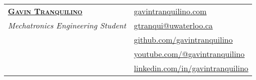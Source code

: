\documentclass[letterpaper]{article}
\begin{document}
\linespread{1.3}




\begin{center}
    \begin{tabularx}{\textwidth}{@{}X X@{}}
        \textbf{\Huge \scshape \href{https://www.gavintranquilino.com}{Gavin Tranquilino}} &
        \textbf{\hfill} \href{https://www.gavintranquilino.com}{\underline{gavintranquilino.com}}                                                                                                             \\
        \textit{\Large Mechatronics Engineering Student}                                   
        & \textbf{\hfill} \href{mailto:gtranqui@uwaterloo.ca}{\underline{gtranqui@uwaterloo.ca}}                     \\
        & \textbf{\hfill} \href{https://github.com/gavintranquilino}{\underline{github.com/gavintranquilino}} \\
        & \textbf{\hfill} \href{https://www.youtube.com/@gavintranquilino}{\underline{youtube.com/@gavintranquilino}} \\
        & \textbf{\hfill} \href{https://linkedin.com/in/gavintranquilino}{\underline{linkedin.com/in/gavintranquilino}} \end{tabularx} \end{center}
\end{document}
